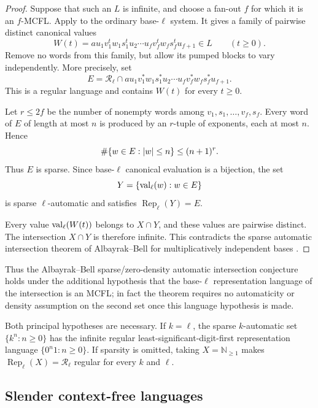 \begin{proof}
  Suppose that such an \(L\) is infinite, and choose a fan-out \(f\) for
  which it is an \(f\)-MCFL. Apply
   to the ordinary base-\(\ell\)
  system. It gives a family of pairwise distinct canonical values
  \[
    W(t)=a u_1v_1^tw_1s_1^tu_2\cdots
      u_fv_f^tw_fs_f^tu_{f+1}\in L
      \qquad(t\ge0).
  \]
  Remove no words from this family, but allow its pumped blocks to vary
  independently. More precisely, set
  \[
    E=\mathcal R_\ell\cap
      a u_1v_1^\ast w_1s_1^\ast u_2\cdots
      u_fv_f^\ast w_fs_f^\ast u_{f+1}.
  \]
  This is a regular language and contains \(W(t)\) for every \(t\ge0\).

  Let \(r\le2f\) be the number of nonempty words among
  \(v_1,s_1,\ldots,v_f,s_f\). Every word of \(E\) of length at most \(n\)
  is produced by an \(r\)-tuple of exponents, each at most \(n\). Hence
  \[
    \#\{w\in E:\lvert w \rvert\le n\}\le(n+1)^r.
  \]
  Thus \(E\) is sparse. Since base-\(\ell\) canonical evaluation is a
  bijection, the set
  \[
    Y=\{\operatorname{val}_\ell(w):w\in E\}
  \]
  is sparse \(\ell\)-automatic and satisfies
  \(\operatorname{Rep}_\ell(Y)=E\).

  Every value \(\operatorname{val}_\ell(W(t))\) belongs to \(X\cap Y\), and these values
  are pairwise distinct. The intersection \(X\cap Y\) is therefore
  infinite. This contradicts the sparse automatic intersection theorem of
  Albayrak--Bell for multiplicatively independent bases
  \cite[Theorem~1.1]{AlbayrakBell2023}.
\end{proof}

Thus the Albayrak--Bell sparse/zero-density automatic intersection conjecture
holds under the additional hypothesis that the base-\(\ell\) representation
language of the intersection is an MCFL; in fact the theorem requires no
automaticity or density assumption on the second set once this language
hypothesis is made.

\begin{remark}[Sharpness]
  Both principal hypotheses are necessary. If \(k=\ell\), the sparse
  \(k\)-automatic set \(\{k^n:n\ge0\}\) has the infinite regular
  least-significant-digit-first representation language
  \(\{0^n1:n\ge0\}\). If sparsity is omitted, taking
  \(X=\mathbb N_{\ge1}\) makes \(\operatorname{Rep}_\ell(X)=\mathcal R_\ell\)
  regular for every \(k\) and \(\ell\).
\end{remark}

\subsection{Slender context-free languages}

